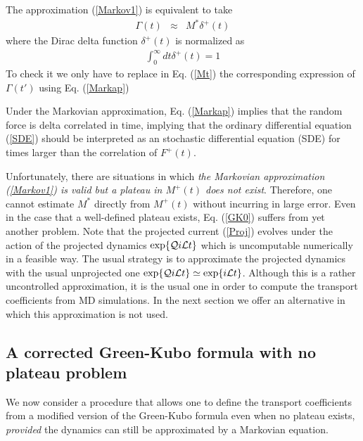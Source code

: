 \documentclass[a4paper,openright,12pt]{book}
\begin{document}
The   approximation
(\ref{Markov1}) is equivalent to take
\begin{eqnarray}
  \Gamma(t) &\approx& M^*\delta^+(t)
\label{Markap}
\end{eqnarray}
where   the Dirac delta function
$\delta^+(t)$ is normalized as
\begin{align}
  \int_0^\infty dt \delta^+(t) =1
\end{align}
To check it we only have to replace in Eq. (\ref{Mt}) the corresponding expression of $\Gamma(t')$ using Eq. (\ref{Markap})

Under the  Markovian approximation,  Eq.  (\ref{Markap})  implies that
the  random force  is  delta  correlated in  time,  implying that  the
ordinary differential equation (\ref{SDE}) should be interpreted as an
stochastic  differential  equation (SDE)  for  times  larger than  the
correlation of $F^+(t)$.


Unfortunately,  there are  situations  in  which \textit{the  Markovian
approximation (\ref{Markov1}) is valid but  a plateau in $M^+(t)$ does
not  exist}.  Therefore,  one  cannot estimate  $M^*$ directly  from
$M^+(t)$ without  incurring in  large error.   Even in  the case  that a
well-defined plateau exists, Eq.  (\ref{GK0}) suffers from yet another
problem.  Note  that the projected current  (\ref{Proj}) evolves under
the  action of  the  projected dynamics  $\exp\{{\cal Q}i{\cal  L}t\}$
which  is  uncomputable numerically  in  a  feasible way.   The  usual
strategy  is to  approximate  the projected  dynamics  with the  usual
unprojected one $\exp\{{\cal Q}i{\cal L}t\}\simeq \exp\{i{\cal L}t\}$.
Although this is a rather  uncontrolled approximation, it is the usual
one  in   order  to  compute   the  transport  coefficients   from  MD
simulations. In the next section we offer an alternative in which this approximation
is not used.



\subsection{A corrected Green-Kubo formula with no plateau problem}
\label{Sec:CorrectedGK}
We now  consider a procedure that  allows one to define  the transport
coefficients from  a modified version  of the Green-Kubo  formula even
when no  plateau exists, \textit{provided}  the dynamics can  still be
approximated by a Markovian equation.
\end{document}
